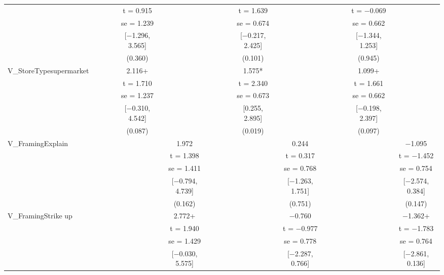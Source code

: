 \documentclass[]{report}
\begin{document}
\begin{table}
{\begin{tabular}[t]{lccccccccccccccc}
		&  &  &  & t = \num{0.915} &  &  &  &  & t = \num{1.639} &  &  &  &  & t = \num{-0.069} & \\
		&  &  &  & se = \num{1.239} &  &  &  &  & se = \num{0.674} &  &  &  &  & se = \num{0.662} & \\
		&  &  &  & {}[\num{-1.296}, \num{3.565}] &  &  &  &  & {}[\num{-0.217}, \num{2.425}] &  &  &  &  & {}[\num{-1.344}, \num{1.253}] & \\
		&  &  &  & (\num{0.360}) &  &  &  &  & (\num{0.101}) &  &  &  &  & (\num{0.945}) & \\
		V\_StoreTypesupermarket &  &  &  & \num{2.116}+ &  &  &  &  & \num{1.575}* &  &  &  &  & \num{1.099}+ & \\
		&  &  &  & t = \num{1.710} &  &  &  &  & t = \num{2.340} &  &  &  &  & t = \num{1.661} & \\
		&  &  &  & se = \num{1.237} &  &  &  &  & se = \num{0.673} &  &  &  &  & se = \num{0.662} & \\
		&  &  &  & {}[\num{-0.310}, \num{4.542}] &  &  &  &  & {}[\num{0.255}, \num{2.895}] &  &  &  &  & {}[\num{-0.198}, \num{2.397}] & \\
		&  &  &  & (\num{0.087}) &  &  &  &  & (\num{0.019}) &  &  &  &  & (\num{0.097}) & \\
		V\_FramingExplain &  &  &  &  & \num{1.972} &  &  &  &  & \num{0.244} &  &  &  &  & \num{-1.095}\\
		&  &  &  &  & t = \num{1.398} &  &  &  &  & t = \num{0.317} &  &  &  &  & t = \num{-1.452}\\
		&  &  &  &  & se = \num{1.411} &  &  &  &  & se = \num{0.768} &  &  &  &  & se = \num{0.754}\\
		&  &  &  &  & {}[\num{-0.794}, \num{4.739}] &  &  &  &  & {}[\num{-1.263}, \num{1.751}] &  &  &  &  & {}[\num{-2.574}, \num{0.384}]\\
		&  &  &  &  & (\num{0.162}) &  &  &  &  & (\num{0.751}) &  &  &  &  & (\num{0.147})\\
		V\_FramingStrike up &  &  &  &  & \num{2.772}+ &  &  &  &  & \num{-0.760} &  &  &  &  & \num{-1.362}+\\
		&  &  &  &  & t = \num{1.940} &  &  &  &  & t = \num{-0.977} &  &  &  &  & t = \num{-1.783}\\
		&  &  &  &  & se = \num{1.429} &  &  &  &  & se = \num{0.778} &  &  &  &  & se = \num{0.764}\\
		&  &  &  &  & {}[\num{-0.030}, \num{5.575}] &  &  &  &  & {}[\num{-2.287}, \num{0.766}] &  &  &  &  & {}[\num{-2.861}, \num{0.136}]\\

\end{tabular}}
\end{table}
\end{document}
